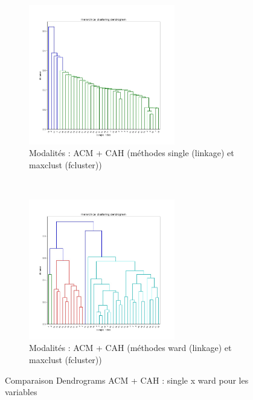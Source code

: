     \begin{figure}[!htb]
        \begin{subfigure}[b]{1.0\textwidth}
            \centering
            \includegraphics[width=0.7\textwidth]{img/mixte_acm_cah/Dendrogram_modalites_'single'_'maxclust'.jpg}
            \caption{Modalités : ACM + CAH (méthodes single (linkage) et maxclust (fcluster))}
            \label{Label_Dendrogram_modalites_'single'_'maxclust'.jpg}
        \end{subfigure}
        \\
        \begin{subfigure}[b]{1.0\textwidth}
            \centering
            \includegraphics[width=0.7\textwidth]{img/mixte_acm_cah/Dendrogram_modalites_'ward'_'maxclust'.jpg}
            \caption{Modalités : ACM + CAH (méthodes ward (linkage) et maxclust (fcluster))}
            \label{Label_Dendrogram_modalites_'ward'_'maxclust'.jpg}
        \end{subfigure}
        \caption{Comparaison Dendrograms ACM + CAH : single x ward pour les variables}
    \end{figure}


